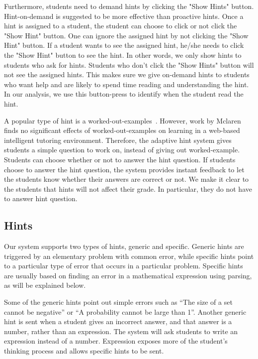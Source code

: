 \documentclass{llncs2e/llncs}
\begin{document}
Furthermore, students need to demand hints by clicking the "Show Hints" button. Hint-on-demand is suggested to be more effective than proactive hints\cite{Razzaq2010}. Once a hint is assigned to a student, the student can choose to click or not click the "Show Hint" button. One can ignore the assigned hint by not clicking the "Show Hint" button. If a student wants to see the assigned hint, he/she needs to click the "Show Hint" button to see the hint. In other words, we only show hints to students who ask for hints. Students who don't click the "Show Hints" button will not see the assigned hints. This makes sure we give on-demand hints to students who want help and are likely to spend time reading and understanding the hint.  In our analysis, we use this button-press to identify when the student read the hint.

A popular type of hint is a worked-out-examples~\cite{Atkinson2000}. However, work by Mclaren~\cite{McLaren2006} finds no significant effects of worked-out-examples on learning in a web-based intelligent tutoring environment. Therefore, the adaptive hint system gives students a simple question to work on, instead of giving out worked-example. Students can choose whether or not to answer the hint question. If students choose to answer the hint question, the system provides instant feedback to let the students know whether their answers are correct or not. We make it clear to the students that hints will not affect their grade. In particular, they do not have to answer hint question.

\subsection*{Hints}

Our system supports two types of hints, generic and specific. Generic hints are triggered by an elementary problem with common error, while specific hints point to a particular type of error that occurs in a particular problem. Specific hints are usually based on finding an error in a mathematical expression using parsing, as will be explained below.

Some of the generic hints point out simple errors such as ``The size of a set cannot be negative'' or ``A probability cannot be large than 1''. Another generic hint is sent when a student gives an incorrect answer, and that answer is a number, rather than an expression. The system will ask students to write an expression instead of a number. Expression exposes more of the student's thinking process and allows specific hints to be sent.
\end{document}

